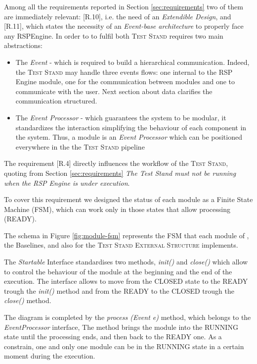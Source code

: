 Among all the requirements reported in Section \ref{sec:requirements} two of them are immediately relevant: [R.10], i.e. the need of an \textit{Extendible Design}, and [R.11], which states the necessity of an \textit{Event-base architecture} to properly face any RSPEngine. In order to to fulfil both \textsc{Test Stand} requires two main abstractions:
\begin{itemize}
\item The \textit{Event} - which is required to build a hierarchical communication. Indeed, the \textsc{Test Stand} may handle three events flows: one internal to the RSP Engine module, one for the communication between modules and one to communicate with the user. Next section about data clarifies the communication structured. 
\item The \textit{Event Processor} -  which guarantees the system to be modular, it standardizes the interaction simplifying the behaviour of each component in the system. Thus, a module is an \textit{Event Processor} which can be positioned everywhere in the the \textsc{Test Stand} pipeline
\end{itemize}

\pagebreak

\noindent The requirement [R.4] directly influences the workflow of the \textsc{Test Stand}, quoting from Section \ref{sec:requirements} \textit{The Test Stand must not be running when the RSP Engine is under execution}. 

To cover this requirement we designed the status of each module as a Finite State Machine (FSM), which can work only in those states that allow processing (READY). 

The schema in Figure \ref{fig:module-fsm} represents the FSM that each module of \namens, the Baselines, and also for the \textsc{Test Stand External Structure} implements. 

The \textit{Startable} Interface standardises two methods, \textit{init()} and \textit{close()} which allow to control the behaviour of the module at the beginning and the end of the execution. The interface allows to move from the CLOSED state to the READY trough the \textit{init()} method and from the READY to the CLOSED trough the \textit{close()} method. 

The diagram is completed by the \textit{process (Event e)} method, which belongs to the \textit{EventProcessor} interface, The method brings the module into the RUNNING state until the processing ends, and then back to the READY one. As a constrain, one and only one module can be in the RUNNING state in a certain moment during the execution.

